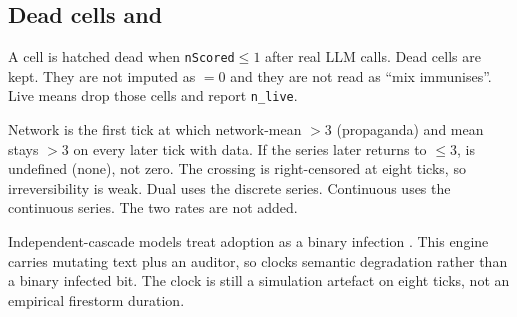 \subsection{Dead cells and \texorpdfstring{\kstar{}}{k*}}

A cell is hatched dead when \texttt{nScored}$\le 1$ after real LLM calls.
Dead cells are kept.
They are not imputed as \MI{}$=0$ and they are not read as \enquote{mix immunises}.
Live means drop those cells and report \texttt{n\_live}.

Network \kstar{} is the first tick at which network-mean \MI{}$>3$ (propaganda) and mean \MI{} stays $>3$ on every later tick with data.
If the series later returns to $\le 3$, \kstar{} is undefined (none), not zero.
The crossing is right-censored at eight ticks, so irreversibility is weak.
Dual \kstar{} uses the discrete series.
Continuous \kstar{} uses the continuous series.
The two rates are not added.

Independent-cascade models treat adoption as a binary infection \parencite{kempe2003influence}.
This engine carries mutating text plus an auditor, so \kstar{} clocks semantic degradation rather than a binary infected bit.
The clock is still a simulation artefact on eight ticks, not an empirical firestorm duration.

